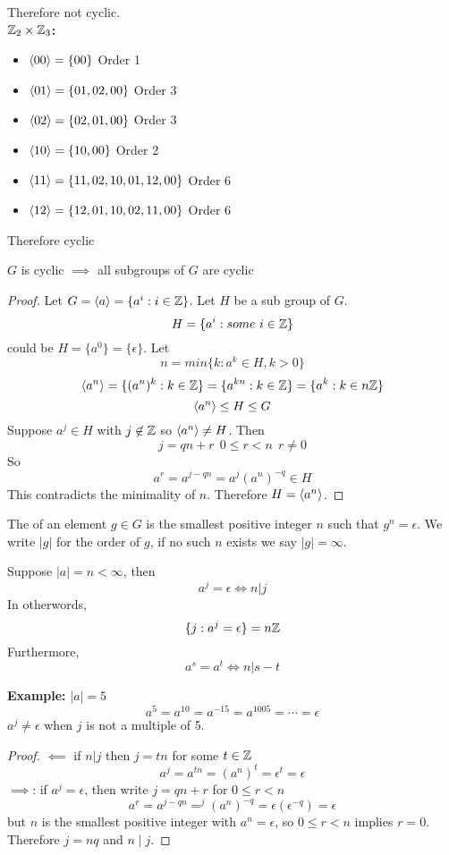 \documentclass[openany]{report}
\begin{document}
Therefore not cyclic.\\[2ex]
\textbf{$\mathbb{Z}_2 \times \mathbb{Z}_3$:}
\begin{itemize}
    \item $\langle 00 \rangle = \{00\}$ Order 1
    \item $\langle 01 \rangle = \{01, 02, 00\}$ Order 3
    \item $\langle 02 \rangle = \{02,01,00\}$ Order 3
    \item $\langle 10 \rangle = \{10,00\}$ Order 2
    \item $\langle 11 \rangle = \{11,02,10,01,12,00\}$ Order 6
    \item $\langle 12 \rangle = \{12,01,10,02,11,00\}$ Order 6
\end{itemize}
Therefore cyclic
\begin{prop}
    $G$ is cyclic $\implies$ all subgroups of $G$ are cyclic
\end{prop}
\begin{proof}
    Let $G = \langle a \rangle = \{a^i : i \in \mathbb{Z}\}$. Let $H$ be a sub group of $G$. 
    $$H = \{a^i : some \ i\in \mathbb{Z}\}$$ 
    could be $H = \{a^0\} = \{\epsilon\}$. Let 
    $$n = min\{k: a^k \in H, k > 0\}$$
    $$\langle a^n \rangle = \{(a^n)^k: k \in \mathbb{Z}\} = \{a^{kn} : k \in \mathbb{Z}\} = \{a^k: k \in n \mathbb{Z}\}$$ 
    $$\langle a^n \rangle \leq H \leq G$$
    Suppose $a^j \in H$ with $j \not\in \mathbb{Z}$ so $\langle a^n \rangle \neq H$. Then 
    \[j = qn + r \ \ 0\leq r < n \ \ r \neq 0\]
    So
    \[a^r = a^{j - qn} = a^j(a^n)^{-q} \in H\]
    This contradicts the minimality of $n$. Therefore $H = \langle a^n \rangle$.
\end{proof}
\begin{definition}[Order]
    The  of an element $g \in G$ is the smallest positive integer $n$ such that $g^n = \epsilon$. We write $|g|$ for the order of $g$, if no such $n$ exists we say $|g| = \infty$.
\end{definition}
\begin{prop}
    Suppose $|a| = n < \infty$, then
    $$a^j = \epsilon \iff n|j$$
    In otherwords, 
    $$\{j: a^j = \epsilon\} = n\mathbb{Z}$$
    Furthermore, 
    $$a^s = a^t \iff n|s-t$$
\end{prop}
\textbf{Example:} $|a| = 5$ 
$$a^5 = a^{10} = a^{-15} = a^{1005} = \cdots = \epsilon$$
$a^j \neq \epsilon$ when $j$ is not a multiple of 5. 
\begin{proof}
    $\impliedby$ if $n|j$ then $j = tn$ for some $t\in \mathbb{Z}$
    $$a^j = a^{tn} = (a^n)^t = \epsilon^t = \epsilon$$
    $\implies$: if $a^j = \epsilon$, then write $j = qn + r$ for $0 \leq r < n$
    $$a^r = a^{j-qn} =
    ^j(a^n)^{-q} = \epsilon (\epsilon^{-q}) = \epsilon$$
     but $n$ is the smallest positive integer with $a^n = \epsilon$, so $0 \leq r < n$ implies $r = 0$. Therefore $j = nq$ and $n \mid j$.  
\end{proof}
\end{document}

